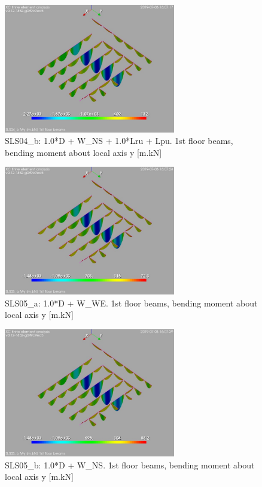 \begin{figure}
\begin{center}
\includegraphics[width=75mm]{annex_res_columns/graphics/resSimplLC/SLS04_bbeamsMy}
\caption{SLS04\_b: 1.0*D + W\_NS + 1.0*Lru + Lpu. 1st floor beams, bending moment about local axis y [m.kN]}
\end{center}
\end{figure}

\begin{figure}
\begin{center}
\includegraphics[width=75mm]{annex_res_columns/graphics/resSimplLC/SLS05_abeamsMy}
\caption{SLS05\_a: 1.0*D + W\_WE. 1st floor beams, bending moment about local axis y [m.kN]}
\end{center}
\end{figure}

\begin{figure}
\begin{center}
\includegraphics[width=75mm]{annex_res_columns/graphics/resSimplLC/SLS05_bbeamsMy}
\caption{SLS05\_b: 1.0*D + W\_NS. 1st floor beams, bending moment about local axis y [m.kN]}
\end{center}
\end{figure}

